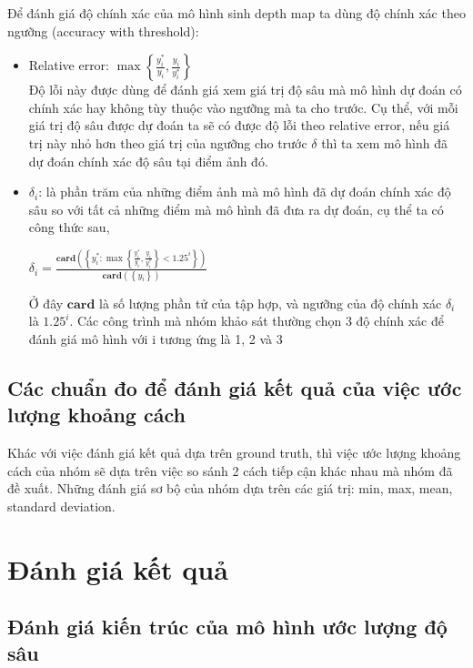 Để đánh giá độ chính xác của mô hình sinh depth map ta dùng độ chính xác theo ngưỡng (accuracy with threshold):\\
\begin{itemize}
\item Relative error: $\max \left \{ \frac{y_i^{*}}{y_i}, \frac{y_i}{y_i^{*}} \right \}$\\
Độ lỗi này được dùng để đánh giá xem giá trị độ sâu mà mô hình dự đoán có chính xác hay không tùy thuộc vào ngưỡng mà ta cho trước. Cụ thể, với mỗi giá trị độ sâu được dự đoán ta sẽ có được độ lỗi theo relative error, nếu giá trị này nhỏ hơn theo giá trị của ngưỡng cho trước $\delta$ thì ta xem mô hình đã dự đoán chính xác độ sâu tại điểm ảnh đó.

\item $\delta_i$: là phần trăm của những điểm ảnh mà mô hình đã dự đoán chính xác độ sâu so với tất cả những điểm mà mô hình đã đưa ra dự đoán, cụ thể ta có công thức sau,
 \begin{center}
 $\delta_i = \frac{\mathbf{card}\left ( \left \{ y_i^{*}:  \max \left \{ \frac{y_i^{*}}{y_i}, \frac{y_i}{y_i^{*}} \right \}  < 1.25^{i} \right \} \right )}{\mathbf{card}\left ( \left \{ y_i \right \} \right )}$
 \end{center}
 Ở đây $\mathbf{card}$ là số lượng phần tử của tập hợp, và ngưỡng của  độ chính xác $\delta_i$ là $1.25^{i}$. Các công trình mà nhóm khảo sát thường chọn 3 độ chính xác để đánh giá mô hình với i tương ứng là 1, 2 và 3
\end{itemize}
\subsection{Các chuẩn đo để đánh giá kết quả của việc ước lượng khoảng cách}
Khác với việc đánh giá kết quả dựa trên ground truth, thì việc ước lượng khoảng cách của nhóm sẽ dựa trên việc so sánh 2 cách tiếp cận khác nhau mà nhóm đã đề xuất. Những đánh giá sơ bộ của nhóm dựa trên các giá trị: min, max, mean, standard deviation.

\section{Đánh giá kết quả}
\subsection{Đánh giá kiến trúc của mô hình ước lượng độ sâu}

